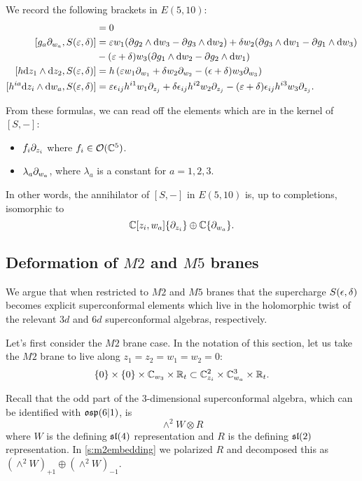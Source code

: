 \documentclass[11pt]{amsart}
\def\vep{\varepsilon}
\begin{document}
We record the following brackets in $E(5,10)$:
\begin{align*}
[f_i \del_{z_i}, S(\vep,\delta)] & = 0 \\
[g_a \del_{w_a}, S(\vep, \delta)] & = \vep w_1 (\del g_2 \wedge \d w_3 - \del g_3 \wedge \d w_2) 
+ \delta w_2 (\del g_3 \wedge \d w_1 - \del g_1 \wedge \d w_3) \\
& - (\vep + \delta) w_3 (\del g_1 \wedge \d w_2 - \del g_2 \wedge \d w_1) \\
[h \d z_1 \wedge \d z_2 , S(\vep, \delta)] & = h \left(\vep w_1 \del_{w_1} + \delta w_2 \del_{w_2} - (\ep + \delta) w_3 \del_{w_3} \right) \\
[h^{ia} \d z_i \wedge \d w_a, S(\vep, \delta)] & = \vep \ep_{ij} h^{i1} w_1 \del_{z_j} + \delta \ep_{ij} h^{i2} w_2 \del_{z_j} - (\vep + \delta) \ep_{ij} h^{i3} w_3 \del_{z_j} .
\end{align*} 

From these formulas, we can read off the elements which are in the kernel of $[S,-]$:
\begin{itemize}
\item $f_i \partial_{z_i}$ where $f_i \in \mathcal O(\mathbb C^5)$. 
\item $\lambda_a \partial_{w_a}$, where $\lambda_a$ is a constant for $a=1,2,3$.  
\end{itemize}
In other words, the annihilator of $[S,-]$ in $E(5,10)$ is, up to completions, isomorphic to 
\[
\mathbb C[z_i, w_a] \{\partial_{z_i}\} \oplus \mathbb C\{\partial_{w_a}\} .
\]

\subsection{Deformation of $M2$ and $M5$ branes}

We argue that when restricted to $M2$ and $M5$ branes that the supercharge $S(\epsilon, \delta)$ becomes explicit superconformal elements which live in the holomorphic twist of the relevant $3d$ and $6d$ superconformal algebras, respectively. 

\parsec[]

Let's first consider the $M2$ brane case. 
In the notation of this section, let us take the $M2$ brane to live along $z_1 = z_2 = w_1 = w_2 = 0$:
\[
\{0\} \times \{0\} \times \mathbb C_{w_3} \times \mathbb R_t \subset \mathbb C^2_{z_i} \times  \mathbb C^3_{w_a} \times \mathbb R_t .
\]

Recall that the odd part of the 3-dimensional superconformal algebra, which can be identified with $\mathfrak{osp}(6|1)$, is 
\[
\wedge^2 W \otimes R 
\]
where $W$ is the defining $\mathfrak{sl}(4)$ representation and $R$ is the defining $\mathfrak{sl}(2)$ representation. 
In \ref{s:m2embedding} we polarized $R$ and decomposed this as $(\wedge^2 W)_{+1} \oplus (\wedge^2 W)_{-1}$. 
\end{document}
